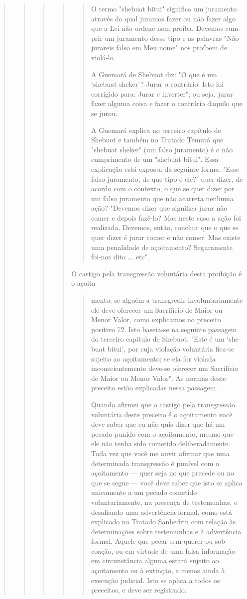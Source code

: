 \begin{quote}
\begin{quote}
\begin{quote}
\begin{quote}
\begin{quote}
O termo "shebuat bitui" significa um juramento através do qual ju­ramos
fazer ou não fazer algo que a Lei não ordene nem proíba. Devemos
cum­prir um juramento desse tipo e as palavras "Não jurareis falso em
Meu nome" nos proíbem de violá-lo.

A Guemará de Shebuot diz: "O que é um `shebuat sheker'? Jurar o
contrário. Isto foi corrigido para: Jurar e inverter"; ou seja, jurar
fazer alguma coisa e fazer o contrário daquilo que se jurou.

A Guemará explica no terceiro capítulo de Shebuot e também no Tra­tado
Temurá que "shebuat sheker" (um falso juramento) é o não cumprimento de
um "shebuat bitui". Essa explicação está exposta da seguinte forma:
"Esse falso juramento, de que tipo é ele?" quer dizer, de acordo com o
contexto, o que se quer dizer por um falso juramento que não acarreta
nenhuma ação? "Devemos dizer que significa jurar não comer e depois
fazê-lo? Mas neste caso a ação foi realizada. Devemos, então, concluir
que o que se quer dizer é jurar comer e não comer. Mas existe uma
penalidade de açoitamento? Seguramente foi-nos dito ... etc".
\end{quote}

O castigo pela transgressão voluntária desta proibição é o açoita-

\begin{quote}
mento; se alguém a transgredir involuntariamente ele deve oferecer um
Sacrifí­cio de Maior ou Menor Valor, como explicamos no preceito
positivo 72. Isto baseia-se na seguinte passagem do terceiro capítulo de
Shebuot: "Este é um `she­buat bitui', por cuja violação voluntária
fica-se sujeito ao açoitamento; se ela for violada inconscientemente
deve-se oferecer um Sacrifício de Maior ou Me­nor Valor". As normas
deste preceito estão explicadas nessa passagem.

Quando afirmei que o castigo pela transgressão voluntária deste
pre­ceito é o açoitamento você deve saber que eu não quis dizer que há
um pecado punido com o açoitamento, mesmo que ele não tenha sido
cometido delibera­damente. Toda vez que você me ouvir afirmar que uma
determinada transgres­são é punível com o açoitamento --- quer seja no
que precede ou no que se segue --- você deve saber que isto se aplica
unicamente a um pecado cometido voluntariamente, na presença de
testemunhas, e desafiando uma advertência formal, como está explicado no
Tratado Sanhedrin com relação às determina­ções sobre testemunhas e à
advertência formal. Aquele que pecar sem querer ou sob coação, ou em
virtude de uma falsa informação em circunstância algu­ma estará sujeito
ao açoitamento ou à extinção, e menos ainda à execução judi­cial. Isto
se aplica a todos os preceitos, e deve ser registrado.


\end{quote}
\end{quote}
\end{quote}
\end{quote}
\end{quote}
